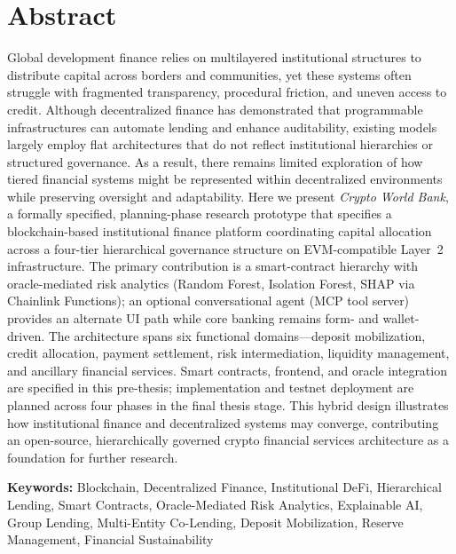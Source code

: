 \documentclass[12pt,a4paper]{report}
\begin{document}
\chapter*{Abstract}
{}

Global development finance relies on multilayered institutional structures to distribute capital across borders and communities, yet these systems often struggle with fragmented transparency, procedural friction, and uneven access to credit. Although decentralized finance has demonstrated that programmable infrastructures can automate lending and enhance auditability, existing models largely employ flat architectures that do not reflect institutional hierarchies or structured governance. As a result, there remains limited exploration of how tiered financial systems might be represented within decentralized environments while preserving oversight and adaptability. Here we present \textit{Crypto World Bank}, a formally specified, planning-phase research prototype that specifies a blockchain-based institutional finance platform coordinating capital allocation across a four-tier hierarchical governance structure on EVM-compatible Layer~2 infrastructure. The primary contribution is a smart-contract hierarchy with oracle-mediated risk analytics (Random Forest, Isolation Forest, SHAP via Chainlink Functions); an optional conversational agent (MCP tool server) provides an alternate UI path while core banking remains form- and wallet-driven. The architecture spans six functional domains---deposit mobilization, credit allocation, payment settlement, risk intermediation, liquidity management, and ancillary financial services. Smart contracts, frontend, and oracle integration are specified in this pre-thesis; implementation and testnet deployment are planned across four phases in the final thesis stage. This hybrid design illustrates how institutional finance and decentralized systems may converge, contributing an open-source, hierarchically governed crypto financial services architecture as a foundation for further research.

\vspace{0.5em}
\noindent\textbf{Keywords:} Blockchain, Decentralized Finance, Institutional DeFi, Hierarchical Lending, Smart Contracts, Oracle-Mediated Risk Analytics, Explainable AI, Group Lending, Multi-Entity Co-Lending, Deposit Mobilization, Reserve Management, Financial Sustainability

\newpage
\thispagestyle{empty}
\end{document}
